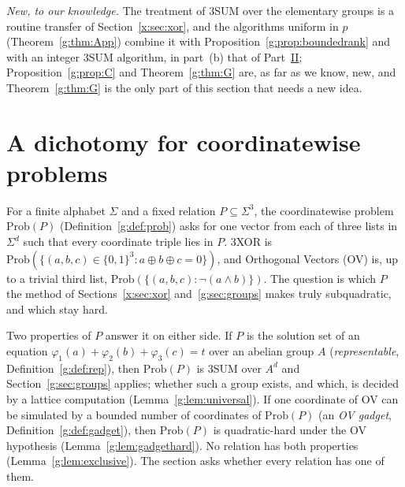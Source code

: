 \documentclass[11pt]{article}
\theoremstyle{definition}
\theoremstyle{remark}
\newcommand{\Prob}{\mathrm{Prob}}
\begin{document}
\emph{New, to our knowledge.} The treatment of 3SUM over the elementary groups is a routine transfer of Section~\ref{x:sec:xor}, and the algorithms uniform in $p$ (Theorem~\ref{g:thm:App}) combine it with Proposition~\ref{g:prop:boundedrank} and with an integer 3SUM algorithm, in part~(b) that of Part~\hyperref[m:partII]{II}; Proposition~\ref{g:prop:C} and Theorem~\ref{g:thm:G} are, as far as we know, new, and Theorem~\ref{g:thm:G} is the only part of this section that needs a new idea.

\section{A dichotomy for coordinatewise problems}\label{g:sec:coord}

For a finite alphabet $\Sigma$ and a fixed relation $P\subseteq\Sigma^3$, the coordinatewise problem $\Prob(P)$ (Definition~\ref{g:def:prob}) asks for one vector from each of three lists in $\Sigma^d$ such that every coordinate triple lies in $P$. 3XOR is $\Prob(\{(a,b,c)\in\{0,1\}^3:a\oplus b\oplus c=0\})$, and Orthogonal Vectors (OV) is, up to a trivial third list, $\Prob(\{(a,b,c):\neg(a\wedge b)\})$. The question is which $P$ the method of Sections~\ref{x:sec:xor} and~\ref{g:sec:groups} makes truly subquadratic, and which stay hard.

Two properties of $P$ answer it on either side. If $P$ is the solution set of an equation $\varphi_1(a)+\varphi_2(b)+\varphi_3(c)=t$ over an abelian group $A$ (\emph{representable}, Definition~\ref{g:def:rep}), then $\Prob(P)$ is 3SUM over $A^d$ and Section~\ref{g:sec:groups} applies; whether such a group exists, and which, is decided by a lattice computation (Lemma~\ref{g:lem:universal}). If one coordinate of OV can be simulated by a bounded number of coordinates of $\Prob(P)$ (an \emph{OV gadget}, Definition~\ref{g:def:gadget}), then $\Prob(P)$ is quadratic-hard under the OV hypothesis (Lemma~\ref{g:lem:gadgethard}). No relation has both properties (Lemma~\ref{g:lem:exclusive}). The section asks whether every relation has one of them.
\end{document}
